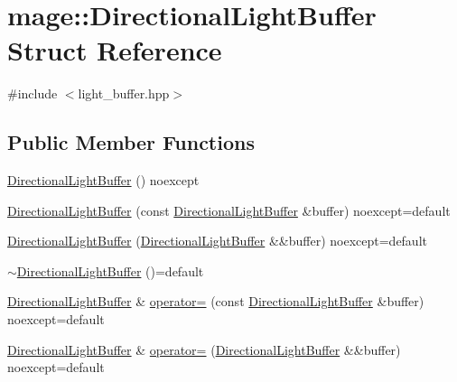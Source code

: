 \hypertarget{structmage_1_1_directional_light_buffer}{}\section{mage\+:\+:Directional\+Light\+Buffer Struct Reference}
\label{structmage_1_1_directional_light_buffer}


{\ttfamily \#include $<$light\+\_\+buffer.\+hpp$>$}

\subsection*{Public Member Functions}
\begin{DoxyCompactItemize}
\item 
\hyperlink{structmage_1_1_directional_light_buffer_a05efc80b9ce0ac27cdef9f1cd3241d70}{Directional\+Light\+Buffer} () noexcept
\item 
\hyperlink{structmage_1_1_directional_light_buffer_a9344489e735a789027ff62f962e875f7}{Directional\+Light\+Buffer} (const \hyperlink{structmage_1_1_directional_light_buffer}{Directional\+Light\+Buffer} \&buffer) noexcept=default
\item 
\hyperlink{structmage_1_1_directional_light_buffer_af8ba47c18ce44fa9638bb7f9654188b7}{Directional\+Light\+Buffer} (\hyperlink{structmage_1_1_directional_light_buffer}{Directional\+Light\+Buffer} \&\&buffer) noexcept=default
\item 
\hyperlink{structmage_1_1_directional_light_buffer_a6d9c1eb4b4b15c586524e5436d9d6162}{$\sim$\+Directional\+Light\+Buffer} ()=default
\item 
\hyperlink{structmage_1_1_directional_light_buffer}{Directional\+Light\+Buffer} \& \hyperlink{structmage_1_1_directional_light_buffer_acb72dcc486af689b5f189bfc68e350cb}{operator=} (const \hyperlink{structmage_1_1_directional_light_buffer}{Directional\+Light\+Buffer} \&buffer) noexcept=default
\item 
\hyperlink{structmage_1_1_directional_light_buffer}{Directional\+Light\+Buffer} \& \hyperlink{structmage_1_1_directional_light_buffer_a2985b19fcdaa4ed6d0e0b07a563bee21}{operator=} (\hyperlink{structmage_1_1_directional_light_buffer}{Directional\+Light\+Buffer} \&\&buffer) noexcept=default
\end{DoxyCompactItemize}
